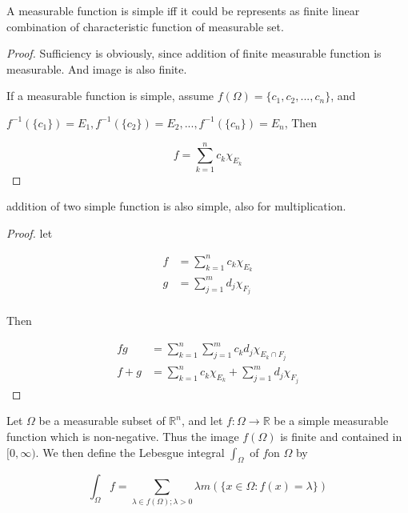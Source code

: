 \begin{thm}
    A measurable function is simple iff it could be represents as finite linear combination of characteristic
    function of measurable set.
\end{thm}

\begin{proof}
    Sufficiency is obviously, since addition of finite measurable function is measurable. And image is also finite.

    If a measurable function is simple, assume $f(\Omega) = \{ c_1,c_2,...,c_n\}$, and 

    $f^{-1}(\{ c_1\}) = E_1, f^{-1}(\{ c_2\}) = E_2, ... , f^{-1}(\{ c_n\}) = E_n$, Then

    \[
        f = \sum_{k=1}^{n} c_k \chi_{E_k}
    \]
\end{proof}

\begin{thm}
    addition of two simple function is also simple, also for multiplication.
\end{thm}

\begin{proof}
    let 

    \begin{align*}
        f &= \sum_{k=1}^{n}c_k \chi_{E_k} \\
        g &= \sum_{j=1}^{m}d_j \chi_{F_j} \\
    \end{align*}

    Then

    \begin{align*}
        f g &= \sum_{k=1}^{n}\sum_{j=1}^{m} c_kd_j \chi_{E_k \cap F_j} \\
        f + g &= \sum_{k=1}^{n} c_k \chi_{E_k} + \sum_{j=1}^{m}d_j \chi_{F_j}
    \end{align*}
\end{proof}

\begin{definition}
    Let $\Omega$ be a measurable subset of $\mathbb{R}^n$, and let $f: \Omega \to \mathbb{R}$ be a simple measurable function which is non-negative.
    Thus the image $f(\Omega)$ is finite and contained in $[0, \infty)$. We then define
the Lebesgue integral $\int_{\Omega}$ of $f$on $\Omega$ by

\[
    \int_{\Omega}f = \sum_{\lambda \in f(\Omega); \lambda > 0} \lambda m(\{ x \in \Omega: f(x) = \lambda \})
\]
\end{definition}

